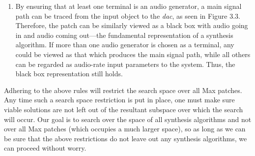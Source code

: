 \documentclass[a4paper,12pt]{report} 	%
\numberwithin{figure}{chapter}
\numberwithin{table}{chapter}
\numberwithin{equation}{chapter}
\begin{document}
\begin{flushleft}
\begin{enumerate}
\begin{figure}[h!]
\begin{center}
\end{center}
\end{figure}
\\
\item By ensuring that at least one terminal is an audio generator, a main signal path can be traced from the input object to the \emph{dac\texttildelow{}}, as seen in Figure 3.3. Therefore, the patch can be similarly viewed as a black box with audio going in and audio coming out---the fundamental representation of a synthesis algorithm. If more than one audio generator is chosen as a terminal, any could be viewed as that which produces the main signal path, while all others can be regarded as audio-rate input parameters to the system. Thus, the black box representation still holds.
\end{enumerate}

Adhering to the above rules will restrict the search space over all Max patches. Any time such a search space restriction is put in place, one must make sure viable solutions are not left out of the resultant subspace over which the search will occur. Our goal is to search over the space of all synthesis algorithms and not over all Max patches (which occupies a much larger space), so as long as we can be sure that the above restrictions do not leave out any synthesis algorithms, we can proceed without worry.


\end{flushleft}
\end{document}
